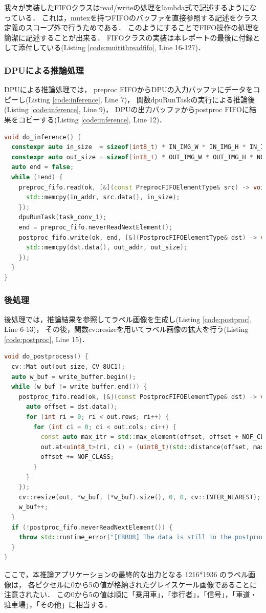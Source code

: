 我々が実装したFIFOクラスはread/writeの処理をlambda式で記述するようになっている．
これは，mutexを持つFIFOのバッファを直接参照する記述をクラス定義のスコープ外で行うためである．
このようにすることでFIFO操作の処理を簡潔に記述することが出来る．
FIFOクラスの実装は本レポートの最後に付録として添付している(Listing \ref{code:muitithreadfifo}, Line 16-127)．

\subsubsection{DPUによる推論処理}
DPUによる推論処理では，
preproc FIFOからDPUの入力バッファにデータをコピーし(Listing \ref{code:inference}, Line 7)，
関数dpuRunTaskの実行による推論後(Listing \ref{code:inference}, Line 9)，
DPUの出力バッファからpostproc FIFOに結果をコピーする(Listing \ref{code:inference}, Line 12)．

\setcounter{lstnumber}{1}
\begin{lstlisting}[language=c++,firstnumber=last,caption=do\_inference(),label=code:inference]
void do_inference() {
  constexpr auto in_size  = sizeof(int8_t) * IN_IMG_W * IN_IMG_H * IN_IMG_C;
  constexpr auto out_size = sizeof(int8_t) * OUT_IMG_W * OUT_IMG_H * NOF_CLASS;
  auto end = false;
  while (!end) {
    preproc_fifo.read(ok, [&](const PreprocFIFOElementType& src) -> void {
      std::memcpy(in_addr, src.data(), in_size);
    });
    dpuRunTask(task_conv_1);
    end = preproc_fifo.neverReadNextElement();
    postproc_fifo.write(ok, end, [&](PostprocFIFOElementType& dst) -> void {
      std::memcpy(dst.data(), out_addr, out_size);
    });
  }
}
\end{lstlisting}

\subsubsection{後処理}
後処理では，推論結果を参照してラベル画像を生成し(Listing \ref{code:postproc}, Line 6-13)，
その後，関数cv::resizeを用いてラベル画像の拡大を行う(Listing \ref{code:postproc}, Line 15)．

\setcounter{lstnumber}{1}
\begin{lstlisting}[language=c++,firstnumber=last,caption=do\_postprocess(),label=code:postproc]
void do_postprocess() {
  cv::Mat out(out_size, CV_8UC1);
  auto w_buf = write_buffer.begin();
  while (w_buf != write_buffer.end()) {
    postproc_fifo.read(ok, [&](const PostprocFIFOElementType& dst) -> void {
      auto offset = dst.data();
      for (int ri = 0; ri < out.rows; ri++) {
        for (int ci = 0; ci < out.cols; ci++) {
          const auto max_itr = std::max_element(offset, offset + NOF_CLASS);
          out.at<uint8_t>(ri, ci) = (uint8_t)(std::distance(offset, max_itr));
          offset += NOF_CLASS;
        }
      }
    });
    cv::resize(out, *w_buf, (*w_buf).size(), 0, 0, cv::INTER_NEAREST);
    w_buf++;
  }
  if (!postproc_fifo.neverReadNextElement()) {
    throw std::runtime_error("[ERROR] The data is still in the postproc FIFO.");
  }
}
\end{lstlisting}

ここで，本推論アプリケーションの最終的な出力となる 1216*1936 のラベル画像は，
各ピクセルに0から5の値が格納されたグレイスケール画像であることに注意されたい．
この0から5の値は順に「乗用車」，「歩行者」，「信号」，「車道・駐車場」，「その他」に相当する．
